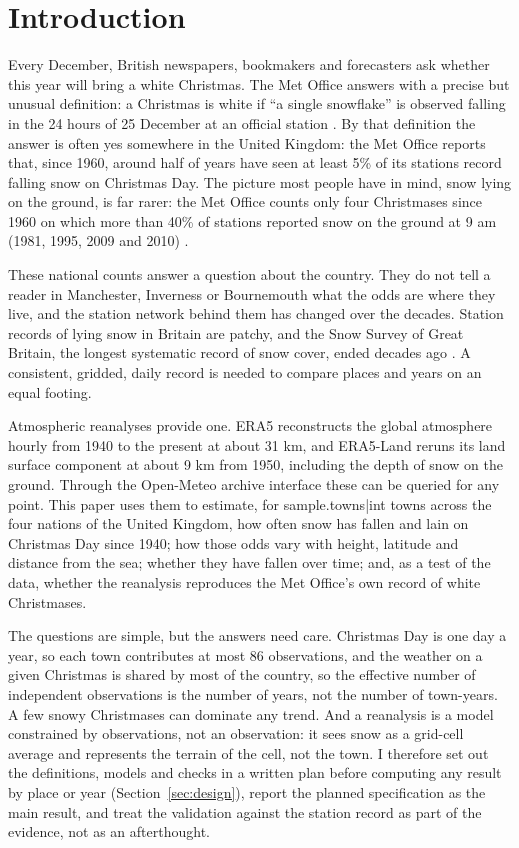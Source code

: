 \documentclass[11pt,a4paper]{article}
\begin{document}
\section{Introduction}
Every December, British newspapers, bookmakers and forecasters ask whether this year will bring a white Christmas. The Met Office answers with a precise but unusual definition: a Christmas is white if ``a single snowflake'' is observed falling in the 24 hours of 25 December at an official station \citep{metoffice2024}. By that definition the answer is often yes somewhere in the United Kingdom: the Met Office reports that, since 1960, around half of years have seen at least 5\% of its stations record falling snow on Christmas Day. The picture most people have in mind, snow lying on the ground, is far rarer: the Met Office counts only four Christmases since 1960 on which more than 40\% of stations reported snow on the ground at 9 am (1981, 1995, 2009 and 2010) \citep{metoffice2024,metoffice2025}.

These national counts answer a question about the country. They do not tell a reader in Manchester, Inverness or Bournemouth what the odds are where they live, and the station network behind them has changed over the decades. Station records of lying snow in Britain are patchy, and the Snow Survey of Great Britain, the longest systematic record of snow cover, ended decades ago \citep{brown2019,brown2020}. A consistent, gridded, daily record is needed to compare places and years on an equal footing.

Atmospheric reanalyses provide one. ERA5 \citep{hersbach2020} reconstructs the global atmosphere hourly from 1940 to the present at about 31 km, and ERA5-Land \citep{munoz2021} reruns its land surface component at about 9 km from 1950, including the depth of snow on the ground. Through the Open-Meteo archive interface \citep{zippenfenig2023} these can be queried for any point. This paper uses them to estimate, for {{sample.towns|int}} towns across the four nations of the United Kingdom, how often snow has fallen and lain on Christmas Day since 1940; how those odds vary with height, latitude and distance from the sea; whether they have fallen over time; and, as a test of the data, whether the reanalysis reproduces the Met Office's own record of white Christmases.

The questions are simple, but the answers need care. Christmas Day is one day a year, so each town contributes at most 86 observations, and the weather on a given Christmas is shared by most of the country, so the effective number of independent observations is the number of years, not the number of town-years. A few snowy Christmases can dominate any trend. And a reanalysis is a model constrained by observations, not an observation: it sees snow as a grid-cell average and represents the terrain of the cell, not the town. I therefore set out the definitions, models and checks in a written plan before computing any result by place or year (Section~\ref{sec:design}), report the planned specification as the main result, and treat the validation against the station record as part of the evidence, not as an afterthought.
\end{document}
